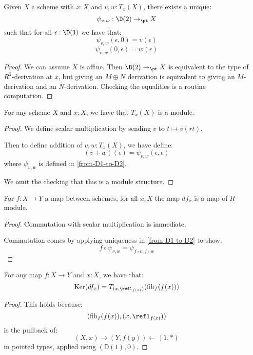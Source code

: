 \begin{lemma}\label{from-D1-to-D2}
Given $X$ a scheme with $x:X$ and $v,w:T_x(X)$, there exists a unique:
\[\psi_{v,w} : \D(2)\to_\pt X\]
such that for all $\epsilon:\D(1)$ we have that:
\[\psi_{v,w}(\epsilon,0) = v(\epsilon)\]
\[\psi_{v,w}(0,\epsilon) = w(\epsilon)\]
\end{lemma}

\begin{proof}
We can assume $X$ is affine. Then $\D(2)\to_\pt X$ is equivalent to the type of $R^2$-derivation at $x$, but giving an $M\oplus N$ derivation is equivalent to giving an $M$-derivation and an $N$-derivation. Checking the equalities is a routine computation.
\end{proof}

\begin{lemma}
For any scheme $X$ and $x:X$, we have that $T_x(X)$ is a module.
\end{lemma}

\begin{proof}
We define scalar multiplication by sending $v$ to $t\mapsto v(rt)$.

Then to define addition of $v,w:T_x(X)$, we have define:
\[(v+w)(\epsilon) = \psi_{v,w}(\epsilon,\epsilon)\]
where $\psi_{v,w}$ is defined in \cref{from-D1-to-D2}.

We omit the checking that this is a module structure.
\end{proof}

\begin{lemma}
For $f:X\to Y$ a map between schemes, for all $x:X$ the map $df_x$ is a map of $R$-module.
\end{lemma}

\begin{proof}
Commutation with scalar multiplication is immediate.

Commutation comes by applying uniqueness in \cref{from-D1-to-D2} to show:
\[f\circ \psi_{v,w} = \psi_{f\circ v,f\circ w}\]
\end{proof}

\begin{lemma}
\label{kernel-is-tangent-of-fibers}
For any map $f:X\to Y$ and $x:X$, we have that:
\[
\mathrm{Ker}(df_x) = T_{(x,\refl_{f(x)})}(\mathrm{fib}_f(f(x)))
\]
\end{lemma}

\begin{proof}
This holds because:
\[
(\mathrm{fib}_f(f(x)),(x,\refl_{f(x)}))
\]
is the pullback of:
\[
(X,x) \to (Y,f(y)) \leftarrow (1,*)
\]
in pointed types, applied using $(\mathbb{D}(1),0)$.
\end{proof}

